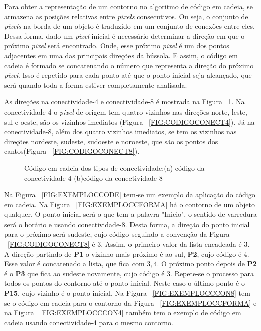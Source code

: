 Para obter a representa\c{c}\~{a}o de um contorno no algoritmo de c\'{o}digo em cadeia, se armazena as posi\c{c}\~{o}es relativas entre \emph{pixels} consecutivos. Ou seja, o conjunto de \emph{pixels} na borda de um objeto \'{e} traduzido em um conjunto de conex\~{o}es entre eles. Dessa forma, dado um \emph{pixel} inicial \'{e} necess\'{a}rio determinar a dire\c{c}\~{a}o em que o pr\'{o}ximo \emph{pixel} ser\'{a} encontrado. Onde, esse pr\'{o}ximo \emph{pixel} \'{e} um dos pontos adjacentes em uma das principais dire\c{c}\~{o}es da b\'{u}ssola. E assim, o c\'{o}digo em cadeia \'{e} formado se concatenando o n\'{u}mero que representa a dire\c{c}\~{a}o do pr\'{o}ximo \emph{pixel}. Isso \'{e} repetido para cada ponto at\'{e} que o ponto inicial seja alcan\c{c}ado, que ser\'{a} quando toda a forma estiver completamente analisada.

As dire\c{c}\~{o}es na conectividade-4 e conectividade-8 \'{e} mostrada na Figura ~\ref{FIG:CODIGOCONECT}. Na conectividade-4 o \emph{pixel} de origem tem quatro vizinhos nas dire\c{c}\~{o}es norte, leste, sul e oeste, s\~{a}o os vizinhos imediatos (Figura ~\ref{FIG:CODIGOCONECT4}). J\'{a} na conectividade-8, al\'{e}m dos quatro vizinhos imediatos, se tem os vizinhos nas dire\c{c}\~{o}es nordeste, sudeste, sudoeste e noroeste, que s\~{a}o os pontos dos cantos(Figura ~\ref{FIG:CODIGOCONECT8})\cite{NIXON:2002}.


\begin{figure}[h]
\centering
{}
\caption[C\'{o}digo em cadeia dos tipos de conectividade]{C\'{o}digo em cadeia dos tipos de conectividade:(a) c\'{o}digo da conectividade-4 (b)c\'{o}digo da conectividade-8} \label{FIG:CODIGOCONECT}
\end{figure}


Na Figura ~\ref{FIG:EXEMPLOCCODE} tem-se um exemplo da aplica\c{c}\~{a}o do c\'{o}digo em cadeia. Na Figura ~\ref{FIG:EXEMPLOCCFORMA} h\'{a} o contorno de um objeto qualquer. O ponto inicial ser\'{a} o que tem a palavra "In\'{\i}cio", o sentido de varredura ser\'{a} o hor\'{a}rio e usando conectividade-8. Desta forma, a dire\c{c}\~{a}o do ponto inicial para o pr\'{o}ximo ser\'{a} sudeste, cujo c\'{o}digo seguindo a conven\c{c}\~{a}o da Figura ~\ref{FIG:CODIGOCONECT8} \'{e} $3$. Assim, o primeiro valor da lista encadeada \'{e} $3$. A dire\c{c}\~{a}o partindo de \textbf{P1} o vizinho mais pr\'{o}ximo \'{e} ao sul, \textbf{P2}, cujo c\'{o}digo \'{e} $4$. Esse valor \'{e} concatenado a lista, que fica com $3,4$. O pr\'{o}ximo ponto depois de \textbf{P2} \'{e} o \textbf{P3} que fica ao sudeste novamente, cujo c\'{o}digo \'{e} 3. Repete-se o processo para todos os pontos do contorno at\'{e} o ponto inicial. Neste caso o \'{u}ltimo ponto \'{e} o \textbf{P15}, cujo vizinho \'{e} o ponto inicial. Na Figura ~\ref{FIG:EXEMPLOCCCON8} tem-se o c\'{o}digo em cadeia para o contorno da Figura ~\ref{FIG:EXEMPLOCCFORMA} e na Figura ~\ref{FIG:EXEMPLOCCCON4} tamb\'{e}m tem o exemplo de c\'{o}digo em cadeia usando conectividade-4 para o mesmo contorno.

